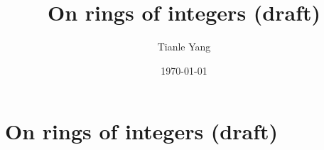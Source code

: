 \documentclass{noteformyself}
\title{On rings of integers (draft)}
\author{Tianle Yang}
\date{\today}
\begin{document}
    \maketitle

    \section{On rings of integers (draft)}

    

\end{document}
